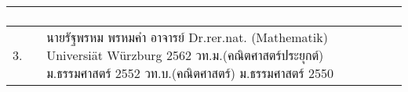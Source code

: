 {\begin{center}
\begin{longtable}{|p{}|p{}|p{}|}
\begin{enumerate}[series=note]
\end{enumerate}
\\ \hline
3. &
นายรัฐพรหม พรหมคำ \newline 
อาจารย์	\newline
Dr.rer.nat. (Mathematik) \newline Universi\"{a}t W\"{u}rzburg 2562 \newline
วท.ม.(คณิตศาสตร์ประยุกต์) \newline ม.ธรรมศาสตร์ 2552  \newline
วท.บ.(คณิตศาสตร์) \newline ม.ธรรมศาสตร์ 2550


\end{longtable}
\end{center}}
